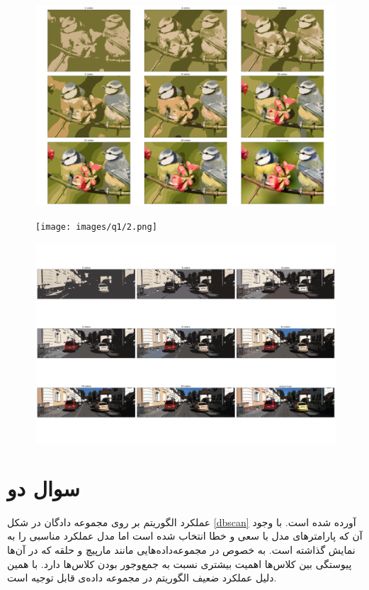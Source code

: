 \documentclass[12pt, a4paper]{article}
\begin{document}
\begin{figure}[h]
    \centering
    \includegraphics[width=0.8\linewidth]{images/q1/0.png}
    \caption{}
    \label{bird}
\end{figure}
\begin{figure}[h]
    \centering
    \texttt{[image: images/q1/2.png]}
    \caption{}
    \label{festival}
\end{figure}
\begin{figure}[h]
    \centering
    \includegraphics[width=\linewidth]{images/q1/1.png}
    \caption{}
    \label{car}
\end{figure}

\clearpage

\section*{سوال دو}

عملکرد الگوریتم  بر روی مجموعه دادگان در شکل \ref{dbscan} آورده شده است.
با وجود آن که پارامتر‌های مدل با سعی و خطا انتخاب شده است اما مدل عملکرد مناسبی را
به نمایش گذاشته است. به خصوص در مجموعه‌داده‌هایی مانند مارپیچ و حلقه که در آن‌ها پیوستگی بین
کلاس‌ها اهمیت بیشتری نسبت به جمع‌وجور بودن کلاس‌ها دارد. با همین دلیل عملکرد ضعیف الگوریتم
در مجموعه داده‌ی  قابل توجیه است.
\end{document}
